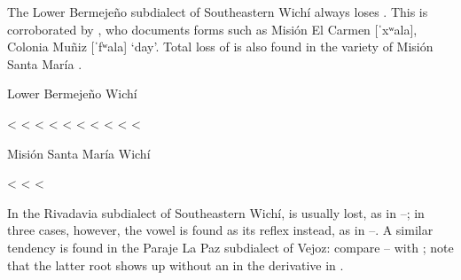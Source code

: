 The Lower Bermejeño subdialect of Southeastern Wichí always loses  . This is corroborated by \citet[138]{MC09}, who documents forms such as Misión El Carmen [ˈxʷala], Colonia Muñiz [ˈfʷala] ‘day’. Total loss of  is also found in the variety of Misión Santa María .

\ea
Lower Bermejeño Wichí \citep{VN14,CS-FL-PR-VN13} \label{wi-lb-xx}\\
    \begin{xlist}
        \ex {} < 
        \ex {} < 
        \ex {} < 
        \ex {} < 
        \ex {} < 
        \ex {} < 
        \ex {} < 
        \ex {} < 
        \ex {} < 
        \ex {} < 
    \end{xlist}
\z
\ea
Misión Santa María Wichí \citep{SS07} \label{wi-msm-xx}\\
    \begin{xlist}
        \ex {} < 
        \ex {} < 
        \ex {} < 
    \end{xlist}
\z

In the Rivadavia subdialect of Southeastern Wichí,  is usually lost, as in –; in three cases, however, the vowel  is found as its reflex instead, as in –. A similar tendency is found in the Paraje La Paz subdialect of Vejoz: compare – with ; note that the latter root shows up without an  in the derivative in .

